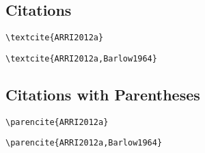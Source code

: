 \subsection*{Citations}
\label{subsec:citations}

\begin{lstlisting}[caption={Citation for Single Author.}]
\textcite{ARRI2012a}
\end{lstlisting}

\textcite{ARRI2012a}

\begin{lstlisting}[caption={Citation for Multiple Authors.}]
\textcite{ARRI2012a,Barlow1964}
\end{lstlisting}

\textcite{ARRI2012a,Barlow1964}

\subsection*{Citations with Parentheses}
\label{subsec:citations-with-parentheses}

\begin{lstlisting}[caption={Citation with Parentheses for Single Author.}]
\parencite{ARRI2012a}
\end{lstlisting}

\parencite{ARRI2012a}

\begin{lstlisting}[caption={Citation with Parentheses for Multiple Authors.}s]
\parencite{ARRI2012a,Barlow1964}
\end{lstlisting}

\parencite{ARRI2012a,Barlow1964}
